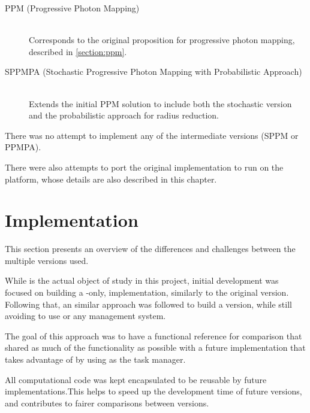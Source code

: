 \documentclass[main.tex]{subfiles}
\begin{document}
\begin{description}
\item[PPM (Progressive Photon Mapping)] \hfill \\
  Corresponds to the original proposition for progressive photon mapping, described in \cref{section:ppm}.

\item[SPPMPA (Stochastic Progressive Photon Mapping with Probabilistic Approach)] \hfill \\
  Extends the initial PPM solution to include both the stochastic version and the probabilistic approach for radius reduction.
\end{description}

There was no attempt to implement any of the intermediate versions (SPPM or PPMPA).

There were also attempts to port the original implementation to run on the \mic platform, whose details are also described in this chapter.




\section{Implementation}

This section presents an overview of the differences and challenges between the multiple versions used.

While \starpu is the actual object of study in this project, initial development was focused on building a \cpu-only, implementation, similarly to the original version. Following that, an similar approach was followed to build a \cuda version, while still avoiding to use \starpu or any \hetplat management system.

The goal of this approach was to have a functional reference for comparison that shared as much of the functionality as possible with a future implementation that takes advantage of \hetplats by using \starpu as the task manager.

All computational code was kept encapsulated to be reusable by future implementations.This helps to speed up the development time of future versions, and contributes to fairer comparisons between versions.







\end{document}
